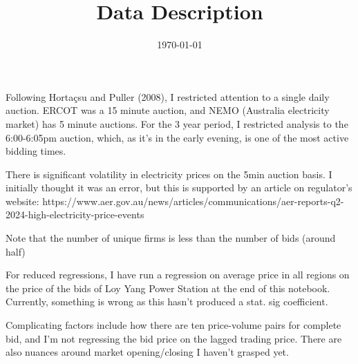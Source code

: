 \documentclass{article} %
\title{Data Description} %
\date{\today}              %
\begin{document}

Following Hortaçsu and Puller (2008), I restricted attention to a single daily auction. ERCOT was a 15 minute auction, and NEMO (Australia electricity market) has 5 minute auctions. For the 3 year period, I restricted analysis to the 6:00-6:05pm auction, which, as it's in the early evening, is one of the most active bidding times.

There is significant volatility in electricity prices on the 5min auction basis. I initially thought it was an error, but this is supported by an article on regulator's website: https://www.aer.gov.au/news/articles/communications/aer-reports-q2-2024-high-electricity-price-events

Note that the number of unique firms is less than the number of bids (around half)

For reduced regressions, I have run a regression on average price in all regions on the price of the bids of Loy Yang Power Station at the end of this notebook. Currently, something is wrong as this hasn't produced a stat. sig coefficient. 


Complicating factors include how there are ten price-volume pairs for complete bid, and I'm not regressing the bid price on the lagged trading price. There are also nuances around market opening/closing I haven't grasped yet.
\end{document}
